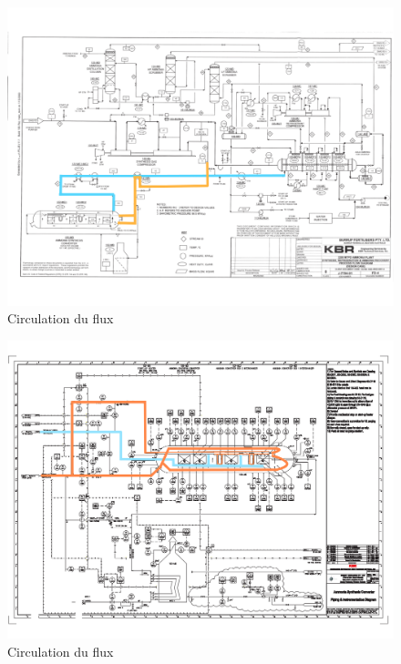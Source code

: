 \documentclass[a4paper,12pt, oneside]{article}
\begin{document}
\begin{figure}
	\includegraphics[scale=0.6]{Plan1.png}
	\caption{Circulation du flux}
	\label{cir1}
	\end{figure}
\begin{figure}
	\includegraphics[scale=0.5]{Plan2.png}
	\caption{Circulation du flux}
	\label{cir2}
\end{figure}
\end{document}

